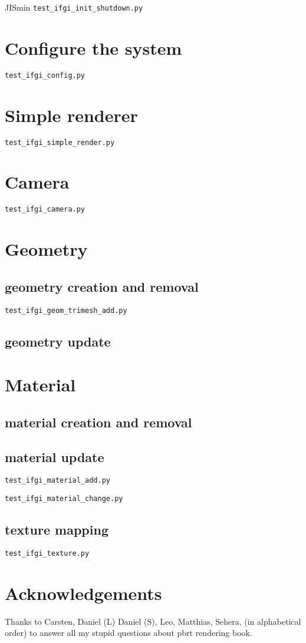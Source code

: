 \documentclass[12pt]{scrartcl}\usepackage{CJK}
\begin{document}
\begin{CJK*}[dnp]{JIS}{min}
\verb|test_ifgi_init_shutdown.py|

\section{Configure the system}

\verb|test_ifgi_config.py|

\section{Simple renderer}

\verb|test_ifgi_simple_render.py|

\section{Camera}

\verb|test_ifgi_camera.py|

\section{Geometry}

\subsection{geometry creation and removal}
\verb|test_ifgi_geom_trimesh_add.py|

\subsection{geometry update}

\section{Material}

\subsection{material creation and removal}

\subsection{material update}

\verb|test_ifgi_material_add.py|

 \verb|test_ifgi_material_change.py|

\subsection{texture mapping}
 \verb|test_ifgi_texture.py|


\section*{Acknowledgements}

Thanks to
Carsten,
Daniel (L)
Daniel (S),
Leo,
Matthias,
Sehera,
(in alphabetical order) to answer all my stupid questions about pbrt
rendering book.

\end{CJK*}
\end{document}
